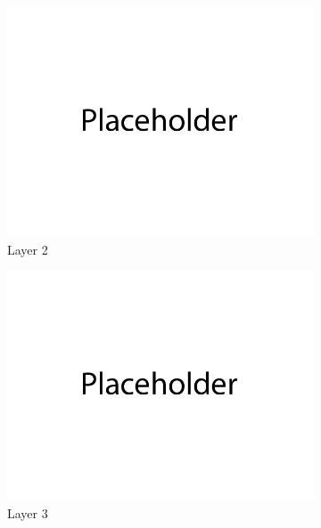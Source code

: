 \documentclass{article}
\begin{document}
\begin{figure}[H]
\begin{subfigure}{0.32\textwidth}
        \includegraphics[width=\textwidth]{figures/q1_latent_space_layer_2.png}
        \caption{Layer 2}
    \end{subfigure}
    \begin{subfigure}{0.32\textwidth}
        \centering
        \includegraphics[width=\textwidth]{figures/q1_latent_space_layer_3.png}
        \caption{Layer 3}
    \end{subfigure}
    \begin{subfigure}{0.32\textwidth}
        \centering

\end{subfigure}
\end{figure}
\end{document}
